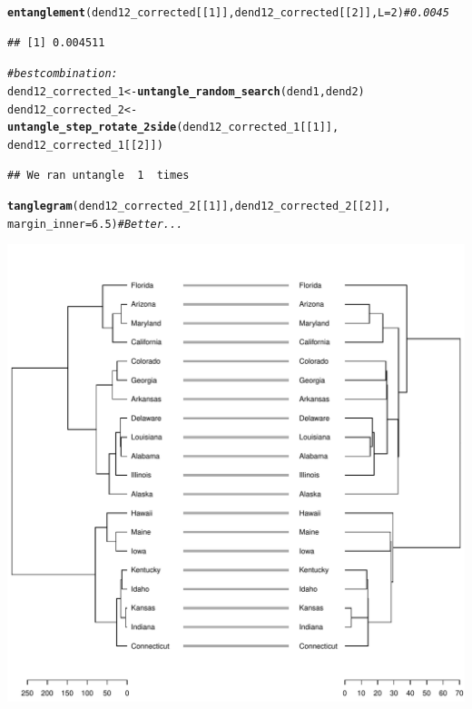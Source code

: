 \documentclass[shortnames,nojss,article]{jss}\usepackage[]{graphicx}\usepackage[]{color}
\makeatletter
\def\maxwidth{ %
  \ifdim\Gin@nat@width>\linewidth
    \linewidth
  \else
    \Gin@nat@width
  \fi
}
\newcommand{\hlnum}[1]{\textcolor[rgb]{0.686,0.059,0.569}{#1}}%
\newcommand{\hlcom}[1]{\textcolor[rgb]{0.678,0.584,0.686}{\textit{#1}}}%
\newcommand{\hlstd}[1]{\textcolor[rgb]{0.345,0.345,0.345}{#1}}%
\newcommand{\hlkwb}[1]{\textcolor[rgb]{0.69,0.353,0.396}{#1}}%
\newcommand{\hlkwc}[1]{\textcolor[rgb]{0.333,0.667,0.333}{#1}}%
\newcommand{\hlkwd}[1]{\textcolor[rgb]{0.737,0.353,0.396}{\textbf{#1}}}%
\newenvironment{kframe}{%
 \def\at@end@of@kframe{}%
 \ifinner\ifhmode%
  \def\at@end@of@kframe{\end{minipage}}%
  \begin{minipage}{\columnwidth}%
 \fi\fi%
 \def\FrameCommand##1{\hskip\@totalleftmargin \hskip-\fboxsep
 \colorbox{shadecolor}{##1}\hskip-\fboxsep
     \hskip-\linewidth \hskip-\@totalleftmargin \hskip\columnwidth}%
 \MakeFramed {\advance\hsize-\width
   \@totalleftmargin\z@ \linewidth\hsize
   \@setminipage}}%
 {\par\unskip\endMakeFramed%
 \at@end@of@kframe}
\newenvironment{knitrout}{}{} %
\makeatother
\begin{document}
\begin{knitrout}
\begin{kframe}\begin{alltt}
\hlkwd{entanglement}\hlstd{(dend12_corrected[[}\hlnum{1}\hlstd{]], dend12_corrected[[}\hlnum{2}\hlstd{]],} \hlkwc{L} \hlstd{=} \hlnum{2}\hlstd{)}  \hlcom{# 0.0045}
\end{alltt}
\begin{verbatim}
## [1] 0.004511
\end{verbatim}
\begin{alltt}
\hlcom{# best combination:}
\hlstd{dend12_corrected_1} \hlkwb{<-} \hlkwd{untangle_random_search}\hlstd{(dend1, dend2)}
\hlstd{dend12_corrected_2} \hlkwb{<-} \hlkwd{untangle_step_rotate_2side}\hlstd{(dend12_corrected_1[[}\hlnum{1}\hlstd{]],}
    \hlstd{dend12_corrected_1[[}\hlnum{2}\hlstd{]])}
\end{alltt}
\begin{verbatim}
## We ran untangle  1  times
\end{verbatim}
\begin{alltt}
\hlkwd{tanglegram}\hlstd{(dend12_corrected_2[[}\hlnum{1}\hlstd{]], dend12_corrected_2[[}\hlnum{2}\hlstd{]],}
    \hlkwc{margin_inner} \hlstd{=} \hlnum{6.5}\hlstd{)}  \hlcom{# Better...}
\end{alltt}
\end{kframe}

{\centering \includegraphics[width=\maxwidth]{figure/unnamed-chunk-404} 

}
\end{knitrout}
\end{document}
